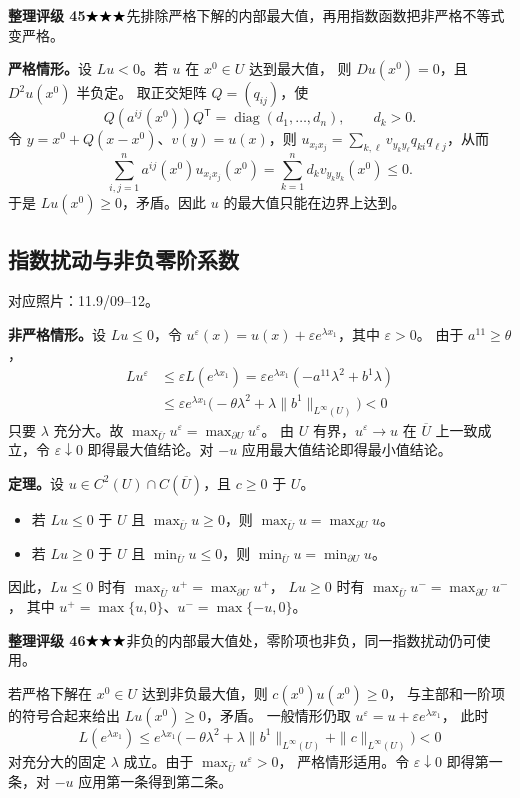 \documentclass[UTF8,a4paper,11pt,fontset=fandol]{ctexart}
\newcommand{\Ub}{\overline U}
\newcommand{\source}[1]{{\small\color{notegray}对应照片：#1。}\par}
\newcommand{\proofstars}[1]{\ensuremath{%
\ifnum#1>0\relax\bigstar\fi
\ifnum#1>1\relax\bigstar\fi
\ifnum#1>2\relax\bigstar\fi
\ifnum#1>3\relax\bigstar\fi
\ifnum#1>4\relax\bigstar\fi}}
\newcommand{\proofrating}[3]{\par{\small\color{proofblue}%
\textbf{整理评级 #1}\enspace\proofstars{#2}\quad #3\par}}
\begin{document}
\proofrating{45}{3}{先排除严格下解的内部最大值，再用指数函数把非严格不等式变严格。}
\textbf{严格情形。}设 $Lu<0$。若 $u$ 在 $x^0\in U$ 达到最大值，
则 $Du(x^0)=0$，且 $D^2u(x^0)$ 半负定。
取正交矩阵 $Q=(q_{ij})$，使
\[
Q(a^{ij}(x^0))Q^\mathsf{T}=\operatorname{diag}(d_1,\ldots,d_n),
\qquad d_k>0.
\]
令 $y=x^0+Q(x-x^0)$、$v(y)=u(x)$，则
$u_{x_ix_j}=\sum_{k,\ell}v_{y_ky_\ell}q_{ki}q_{\ell j}$，从而
\[
\sum_{i,j=1}^n a^{ij}(x^0)u_{x_ix_j}(x^0)
=\sum_{k=1}^n d_kv_{y_ky_k}(x^0)\le0.
\]
于是 $Lu(x^0)\ge0$，矛盾。因此 $u$ 的最大值只能在边界上达到。

\newpage
\subsection{指数扰动与非负零阶系数}
\source{11.9/09--12}
\textbf{非严格情形。}设 $Lu\le0$，令
$u^\varepsilon(x)=u(x)+\varepsilon e^{\lambda x_1}$，其中 $\varepsilon>0$。
由于 $a^{11}\ge\theta$，
\[
\begin{aligned}
Lu^\varepsilon
&\le\varepsilon L(e^{\lambda x_1})
=\varepsilon e^{\lambda x_1}(-a^{11}\lambda^2+b^1\lambda)\\
&\le \varepsilon e^{\lambda x_1}
\bigl(-\theta\lambda^2+\lambda\|b^1\|_{L^\infty(U)}\bigr)<0
\end{aligned}
\]
只要 $\lambda$ 充分大。故 $\max_{\Ub}u^\varepsilon=\max_{\partial U}u^\varepsilon$。
由 $U$ 有界，$u^\varepsilon\to u$ 在 $\Ub$ 上一致成立，令 $\varepsilon\downarrow0$
即得最大值结论。对 $-u$ 应用最大值结论即得最小值结论。

\textbf{定理。}设 $u\in C^2(U)\cap C(\Ub)$，且 $c\ge0$ 于 $U$。
\begin{itemize}
\item 若 $Lu\le0$ 于 $U$ 且 $\max_{\Ub}u\ge0$，则
$\max_{\Ub}u=\max_{\partial U}u$。
\item 若 $Lu\ge0$ 于 $U$ 且 $\min_{\Ub}u\le0$，则
$\min_{\Ub}u=\min_{\partial U}u$。
\end{itemize}
因此，$Lu\le0$ 时有 $\max_{\Ub}u^+=\max_{\partial U}u^+$，
$Lu\ge0$ 时有 $\max_{\Ub}u^-=\max_{\partial U}u^-$，
其中 $u^+=\max\{u,0\}$、$u^-=\max\{-u,0\}$。

\proofrating{46}{3}{非负的内部最大值处，零阶项也非负，同一指数扰动仍可使用。}
若严格下解在 $x^0\in U$ 达到非负最大值，则 $c(x^0)u(x^0)\ge0$，
与主部和一阶项的符号合起来给出 $Lu(x^0)\ge0$，矛盾。
一般情形仍取 $u^\varepsilon=u+\varepsilon e^{\lambda x_1}$，
此时
\[
L(e^{\lambda x_1})\le e^{\lambda x_1}
\bigl(-\theta\lambda^2+\lambda\|b^1\|_{L^\infty(U)}
+\|c\|_{L^\infty(U)}\bigr)<0
\]
对充分大的固定 $\lambda$ 成立。由于 $\max_{\Ub}u^\varepsilon>0$，
严格情形适用。令 $\varepsilon\downarrow0$ 即得第一条，对 $-u$ 应用第一条得到第二条。
\end{document}
